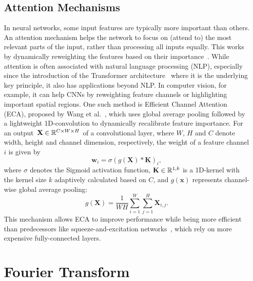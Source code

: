 \subsection{Attention Mechanisms}

In neural networks, some input features are typically more important than others.
An attention mechanism helps the network to focus on (attend to) the most relevant parts of the input, rather than processing all inputs equally.
This works by dynamically reweighting the features based on their importance~\cite{Attention}.
While attention is often associated with natural language processing (NLP), especially since the introduction of the Transformer architecture~\cite{Transformer} where it is the underlying key principle, it also has applications beyond NLP.\@
In computer vision, for example, it can help CNNs by reweighting feature channels or highlighting important spatial regions.
One such method is Efficient Channel Attention (ECA), proposed by Wang et al.~\cite{ECA}, which uses global average pooling followed by a lightweight 1D-convolution to dynamically recalibrate feature importance.
For an output~$\mathbf{X} \in \mathbb{R}^{C \times W \times H}$ of a convolutional layer, where $W$, $H$ and $C$ denote width, height and channel dimension, respectively, the weight of a feature channel $i$ is given by
\begin{equation}
    \mathbf{w}_i = \sigma(g(\mathbf{X}) \ast \mathbf{K})_i,
\end{equation}
where $\sigma$ denotes the Sigmoid activation function, $\mathbf{K} \in \mathbb{R}^{1,k}$ is a 1D-kernel with the kernel size $k$ adaptively calculated based on $C$, and $g(\mathbf{x})$ represents channel-wise global average pooling:
\begin{equation}
    g(\mathbf{X}) = \frac{1}{WH} \sum_{i=1}^{W} \sum_{j=1}^{H} \mathbf{X}_{i,j}.
\end{equation}
This mechanism allows ECA to improve performance while being more efficient than predecessors like squeeze-and-excitation networks~\cite{SqueezeExcite}, which rely on more expensive fully-connected layers.

\section{Fourier Transform}

